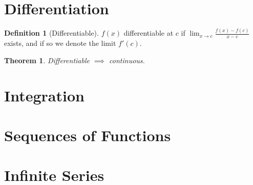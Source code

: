 \documentclass[12pt, oneside]{article}
\theoremstyle{definition}
\newtheorem{defn}{Definition}
\theoremstyle{plain}
\newtheorem{thm}{Theorem}
\theoremstyle{remark}
\let\origsection=\section
\renewcommand\section[1]{\origsection{#1}\label{sec:\thesection}}
\begin{document}
\section{Differentiation}
\begin{defn}[Differentiable]
  $f(x)$ differentiable at $c$ if $\lim_{x \to c} \frac{f(x) -f(c)}{x - c}$ exists, and if so we denote the limit $f'(c)$.
\end{defn}

\begin{thm}
  Differentiable $\implies$ continuous.
\end{thm}
\section{Integration}

\section{Sequences of Functions}

\section{Infinite Series}
\end{document}
